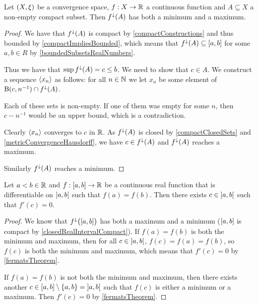\begin{theorem} \label{extremeValueTheorem}
Let $\sSet{X,\xi}$ be a convergence space, $f: X\to \mathbb{R}$ a continuous function and $A\subseteq X$ a non-empty compact subset. Then $f^\downarrow(A)$ has both a minimum and a maximum.
\end{theorem}
\begin{proof}
We have that $f^\downarrow(A)$ is compact by \ref{compactConstructions} and thus bounded by \ref{compactImpliesBounded}, which means that $f^\imf(A) \subseteq \interval{a,b}$ for some $a,b\in R$ by \ref{boundedSubsetsRealNumbers}.

Thus we have that $\sup f^{\downarrow}(A) = c \leq b$. We need to show that $c\in A$. We construct a sequence $\left\langle x_n \right\rangle$ as follows: for all $n\in \mathbb{N}$ we let $x_n$ be some element of $\operatorname{B}(c, n^{-1})\cap f^{\downarrow}(A)$.

Each of these sets is non-empty. If one of them was empty for some $n$, then $c-n^{-1}$ would be an upper bound, which is a contradiction.

Clearly $\left\langle x_n \right\rangle$ converges to $c$ in $\mathbb{R}$. As $f^\downarrow(A)$ is closed by \ref{compactClosedSets} and \ref{metricConvergenceHausdorff}, we have $c\in f^\downarrow(A)$ and $f^{\downarrow}(A)$ reaches a maximum.

Similarly $f^{\downarrow}(A)$ reaches a minimum.
\end{proof}
\begin{corollary} \label{RollesTheorem}
Let $a<b\in \mathbb{R}$ and $f: \interval{a,b}\to \R$ be a continuous real function that is differentiable on $\interval[o]{a,b}$ such that $f(a) = f(b)$. Then there exists $c\in \interval[o]{a,b}$ such that $f'(c) = 0$.
\end{corollary}
\begin{proof}
We know that $f^{\imf}\big(\interval{a,b}\big)$ has both a maximum and a minimum ($\interval{a,b}$ is compact by \ref{closedRealIntervalCompact}). If $f(a) = f(b)$ is both the minimum and maximum, then for all $c\in \interval[o]{a,b}$, $f(c) = f(a) = f(b)$, so $f(c)$ is both the minimum and maximum, which means that $f'(c) = 0$ by \ref{fermatsTheorem}.

If $f(a) = f(b)$ is not both the minimum and maximum, then there exists another $c\in \interval{a,b}\setminus\{a,b\} = \interval[o]{a,b}$ such that $f(c)$ is either a minimum or a maximum. Then $f'(c) = 0$ by \ref{fermatsTheorem}.
\end{proof}


